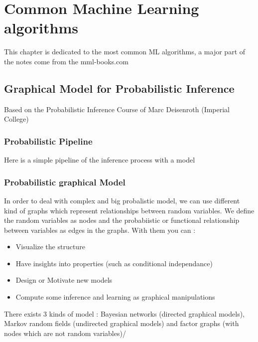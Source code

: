 \chapter{Common Machine Learning algorithms}\label{ch:introduction}

This chapter is dedicated to the most common ML algorithms, a major part of the notes come from the mml-books.com 


\section{Graphical Model for Probabilistic Inference}

Based on the Probabilistic Inference Course of Marc Deisenroth (Imperial College)

	\subsection{Probabilistic Pipeline}

	Here is a simple pipeline of the inference process with a model


	\subsection{Probabilistic graphical Model}

		In order to deal with complex and big probalistic model, we can use different kind of graphs which represent relationships between random variables. We define the random variables as nodes and the probabiistic or functional relationship between variables as edges in the graphs. With them you can :
		\begin{itemize}
			\item Visualize the structure
			\item Have insights into properties (such as conditional independance)
			\item Design or Motivate new models
			\item Compute some inference and learning as graphical manipulations
		\end{itemize}

		There exists 3 kinds of model : Bayesian networks (directed graphical models), Markov random fields (undirected graphical models) and factor graphs (with nodes which are not random variables)/

